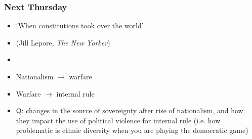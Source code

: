 \documentclass[utf8, xcolor=dvipsnames]{beamer}
\begin{document}
\begin{frame}
\frametitle{Next Thursday}
\centering

\begin{itemize}
  \item `When constitutions took over the world'
  \item[] (Jill Lepore, \textit{The New Yorker})
  \item[]
  \item Nationalism $\rightarrow$ warfare
  \item Warfare $\rightarrow$ internal rule
  \item Q: changes in the source of sovereignty after rise of nationalism, and how they impact the use of political violence for internal rule (i.e. how problematic is ethnic diversity when you are playing the democratic game)
\end{itemize}

\end{frame}
\end{document}
